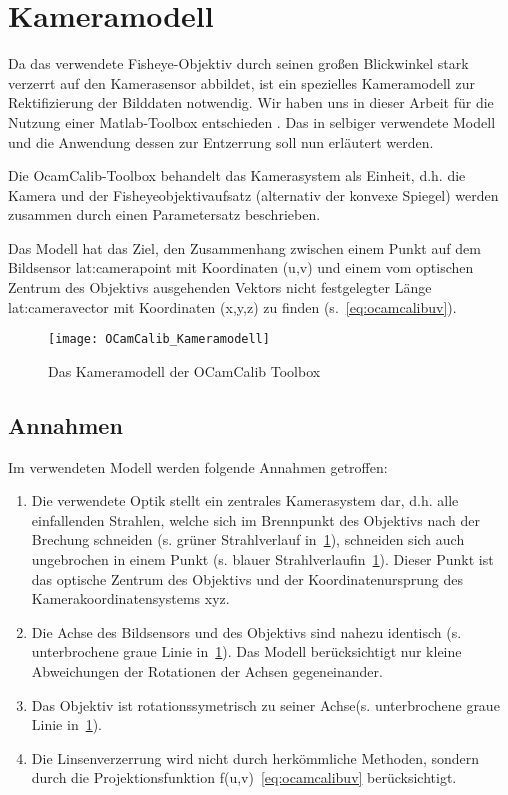 \section{Kameramodell}
Da das verwendete Fisheye-Objektiv durch seinen großen Blickwinkel stark verzerrt auf den Kamerasensor abbildet, ist ein spezielles Kameramodell zur Rektifizierung der Bilddaten notwendig. Wir haben uns in dieser Arbeit für die Nutzung einer Matlab-Toolbox entschieden  \autocite{OCamCalibOmnidirectionalCamera, scaramuzzaFlexibleTechniqueAccurate2006, scaramuzzaToolboxEasilyCalibrating2006, scaramuzzaOmnidirectionalVisionCalibration2007, rufliAutomaticDetectionCheckerboards2008}. Das in selbiger verwendete Modell und die Anwendung dessen zur Entzerrung soll nun erläutert werden. 

Die OcamCalib-Toolbox behandelt das Kamerasystem als Einheit, d.h. die Kamera und der Fisheyeobjektivaufsatz (alternativ der konvexe Spiegel) werden zusammen durch einen Parametersatz beschrieben.

Das Modell hat das Ziel, den Zusammenhang zwischen einem Punkt auf dem Bildsensor \gls{lat:camerapoint} mit Koordinaten (u,v) und einem vom optischen Zentrum des Objektivs ausgehenden Vektors nicht festgelegter Länge \gls{lat:cameravector} mit Koordinaten (x,y,z) zu finden (s.~\eqref{eq:ocamcalibuv}).

\begin{figure}[H]
  \centering
  \texttt{[image: OCamCalib\_Kameramodell]}
  \caption{Das Kameramodell der OCamCalib Toolbox}
  \label{fig:kameramodell}
\end{figure}

\subsection{Annahmen}
Im verwendeten Modell werden folgende Annahmen getroffen:
\begin{enumerate}
\item Die verwendete Optik stellt ein zentrales Kamerasystem dar, d.h. alle einfallenden Strahlen, welche sich im Brennpunkt des Objektivs nach der Brechung schneiden (s. grüner Strahlverlauf in~\ref{fig:kameramodell}), schneiden sich auch ungebrochen in einem Punkt (s. blauer Strahlverlaufin~\ref{fig:kameramodell}). Dieser Punkt ist das optische Zentrum des Objektivs und der Koordinatenursprung des Kamerakoordinatensystems xyz.
\item \label{item:ocamcalibassm2} Die Achse des Bildsensors und des Objektivs sind nahezu identisch (s. unterbrochene graue Linie in~\ref{fig:kameramodell}). Das Modell berücksichtigt nur kleine Abweichungen der Rotationen der Achsen gegeneinander.
\item Das Objektiv ist rotationssymetrisch zu seiner Achse(s. unterbrochene graue Linie in~\ref{fig:kameramodell}).
\item Die Linsenverzerrung wird nicht durch herkömmliche Methoden, sondern durch die Projektionsfunktion f(u,v)~\eqref{eq:ocamcalibuv} berücksichtigt.
\end{enumerate}

